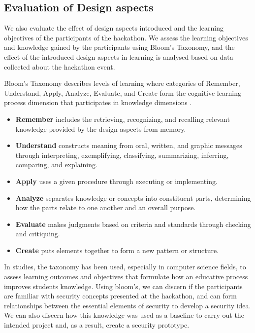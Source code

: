 \documentclass[runningheads]{llncs}
\begin{document}
\subsection{Evaluation of Design aspects}\label{sec:blooms}
We also evaluate the effect of design aspects introduced and the learning objectives of the participants of the hackathon. We assess the learning objectives and knowledge gained by the participants using Bloom's Taxonomy, and the effect of the introduced design aspects in learning is analysed based on data collected about the hackathon event.

Bloom's Taxonomy describes levels of learning where categories of Remember, Understand, Apply, Analyze, Evaluate, and Create form the cognitive learning process dimension that participates in knowledge dimensions \cite{bloom1956taxonomy,krathwohl2009taxonomy}.
\begin{itemize}
    \item \textbf{Remember} includes the retrieving, recognizing, and recalling relevant knowledge provided by the design aspects from memory.
    \item \textbf{Understand} constructs meaning from oral, written, and graphic messages through interpreting, exemplifying, classifying, summarizing, inferring, comparing, and explaining.
    \item \textbf{Apply} uses a given procedure through executing or implementing.
    \item \textbf{Analyze} separates knowledge or concepts into constituent parts, determining how the parts relate to one another and an overall purpose.
    \item \textbf{Evaluate} makes judgments based on criteria and standards through checking and critiquing.
    \item \textbf{Create} puts elements together to form a new pattern or structure.
\end{itemize}
In studies, the taxonomy has been used, especially in computer science fields, to assess learning outcomes and objectives that formulate how an educative process \cite{starr2008bloom,thompson2008bloom} improves students knowledge. Using bloom's, we can discern if the participants are familiar with security concepts presented at the hackathon, and can form relationships between the essential elements of security to develop a security idea. We can also discern how this knowledge was used as a baseline to carry out the intended project and, as a result, create a security prototype.
\end{document}
